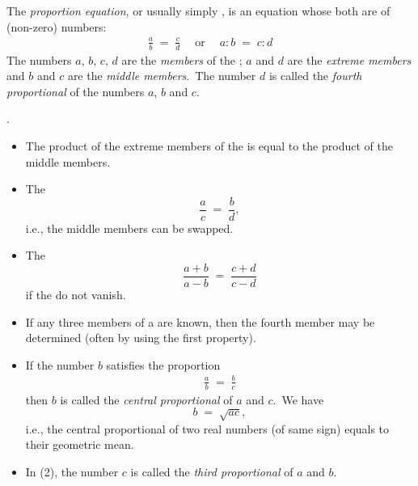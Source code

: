 \documentclass[12pt]{article}
\begin{document}
The {\it proportion equation}, or usually simply 
, is an equation whose both  are  of (non-zero) numbers:
\begin{align}
           \frac{a}{b} \;=\; \frac{c}{d} 
           \;\quad \mbox{or} \;\quad a:b \;=\; c:d
\end{align}
The numbers $a$, $b$, $c$, $d$ are the {\it members} of the ; $a$ and $d$ are the {\em extreme members} and $b$ and $c$ are the {\em middle members}.\, The number $d$ is called the {\em fourth proportional} of the numbers $a$, $b$ and $c$.

\textbf{}.
\begin{itemize}
 \item The product of the extreme members of the  is equal to the product of the middle members.
 \item The 
$$\frac{a}{c} \;=\; \frac{b}{d},$$
i.e., the middle members can be swapped.
 \item The 
$$\frac{a\!+\!b}{a\!-\!b} \;=\; \frac{c\!+\!d}{c\!-\!d}$$
if the  do not vanish.
 \item If any three members of a  are known, then the fourth member may be determined (often by using the first property).
 \item If the number $b$ satisfies the proportion
\begin{align}
\frac{a}{b} \;=\; \frac{b}{c}
\end{align}
then $b$ is called the {\em central proportional} of $a$ and $c$.\, We have
$$b \;=\; \sqrt{ac},$$
i.e., the central proportional of two real numbers (of same sign) equals to their geometric mean.
\item In (2), the number $c$ is called the {\em third proportional} of $a$ and $b$.
\end{itemize}
\end{document}
